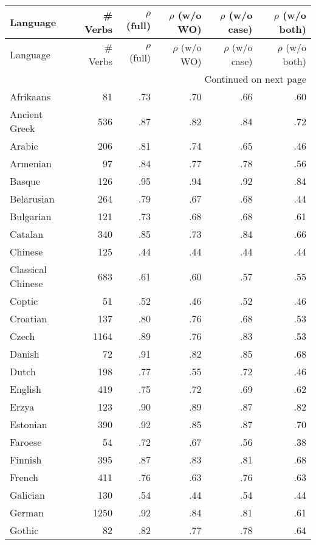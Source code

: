 \begin{longtable}{lrrrrr}
    \toprule
    Language & \# Verbs & $\rho$ (full) & $\rho$ (w/o WO) & $\rho$ (w/o case) & $\rho$ (w/o both)\\
    \midrule
    \endfirsthead
    \toprule
    Language & \# Verbs & $\rho$ (full) & $\rho$ (w/o WO) & $\rho$ (w/o case) & $\rho$ (w/o both)\\
    \midrule
    \endhead
    \midrule
    \multicolumn{6}{r}{Continued on next page} \\
    \midrule
    \endfoot
    \bottomrule
    \endlastfoot
    Afrikaans & 81 & .73 & .70 & .66 & .60 \\
    Ancient Greek & 536 & .87 & .82 & .84 & .72 \\
    Arabic & 206 & .81 & .74 & .65 & .46 \\
    Armenian & 97 & .84 & .77 & .78 & .56 \\
    Basque & 126 & .95 & .94 & .92 & .84 \\
    Belarusian & 264 & .79 & .67 & .68 & .44 \\
    Bulgarian & 121 & .73 & .68 & .68 & .61 \\
    Catalan & 340 & .85 & .73 & .84 & .66 \\
    Chinese & 125 & .44 & .44 & .44 & .44 \\
    Classical Chinese & 683 & .61 & .60 & .57 & .55 \\
    Coptic & 51 & .52 & .46 & .52 & .46 \\
    Croatian & 137 & .80 & .76 & .68 & .53 \\
    Czech & 1164 & .89 & .76 & .83 & .53 \\
    Danish & 72 & .91 & .82 & .85 & .68 \\
    Dutch & 198 & .77 & .55 & .72 & .46 \\
    English & 419 & .75 & .72 & .69 & .62 \\
    Erzya & 123 & .90 & .89 & .87 & .82 \\
    Estonian & 390 & .92 & .85 & .87 & .70 \\
    Faroese & 54 & .72 & .67 & .56 & .38 \\
    Finnish & 395 & .87 & .83 & .81 & .68 \\
    French & 411 & .76 & .63 & .76 & .63 \\
    Galician & 130 & .54 & .44 & .54 & .44 \\
    German & 1250 & .92 & .84 & .81 & .61 \\
    Gothic & 82 & .82 & .77 & .78 & .64 \\

\end{longtable}
